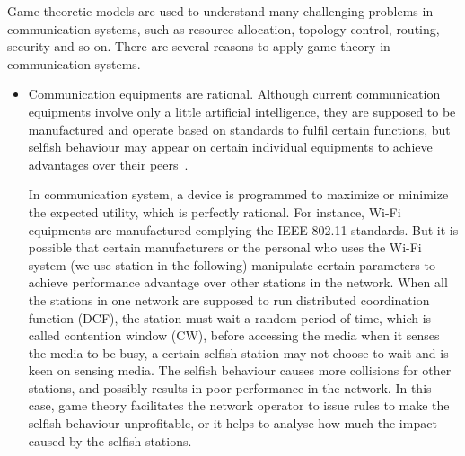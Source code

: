Game theoretic models are used to understand many challenging problems in communication systems, such as resource allocation, topology control, routing, security and so on. 
There are several reasons to apply game theory in communication systems.
\begin{itemize}
\item Communication equipments are rational.
Although current communication equipments involve only a little artificial intelligence, they are supposed to be manufactured and operate based on standards to fulfil certain functions, but selfish behaviour may appear on certain individual equipments to achieve advantages over their peers~\cite{game_for_communication_01}.

In communication system, a device is programmed to maximize or minimize the expected utility, which is perfectly rational.
For instance, Wi-Fi equipments are manufactured complying the IEEE 802.11 standards.
But it is possible that certain manufacturers or the personal who uses the Wi-Fi system (we use station in the following) manipulate certain parameters to achieve performance advantage over other stations in the network.
When all the stations in one network are supposed to run distributed coordination function (DCF), \ie the station must wait a random period of time, which is called contention window (CW), before accessing the media when it senses the media to be busy, a certain selfish station may not choose to wait and is keen on sensing media.
The selfish behaviour causes more collisions for other stations, and possibly results in poor performance in the network.
In this case, game theory facilitates the network operator to issue rules to make the selfish behaviour unprofitable, or it helps to analyse how much the impact caused by the selfish stations.


\end{itemize}
